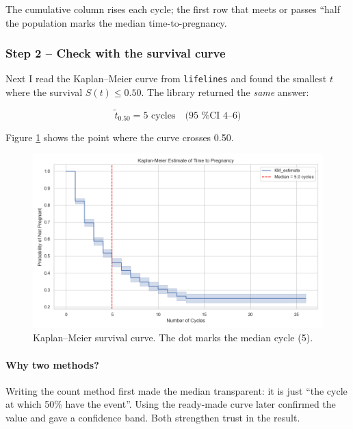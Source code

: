 \documentclass[11pt,a4paper]{article}
\begin{document}
The cumulative column rises each cycle; the first row that meets or passes
“half the population marks the median time-to-pregnancy.

\subsubsection{Step 2 – Check with the survival curve}
Next I read the Kaplan–Meier curve from \texttt{lifelines} and found the smallest
$t$ where the survival \(S(t)\le0.50\).
The library returned the \emph{same} answer:

\[
\tilde{t}_{0.50}=5 \text{ cycles} \quad\text{(95 \% CI 4–6)}
\]

Figure \ref{fig:km_median} shows the point where the curve crosses 0.50.

\begin{figure}[htbp]
  \centering
  \includegraphics[width=0.8\linewidth]{../results/Kaplan_meier_all.png}
  \caption{Kaplan–Meier survival curve.  The dot marks the median cycle (5).}
  \label{fig:km_median}
\end{figure}
\FloatBarrier

\paragraph{Why two methods?}
Writing the count method first made the median transparent:
it is just “the cycle at which 50\% have the event”.
Using the ready-made curve later confirmed the value and gave a confidence band.
Both strengthen trust in the result.



\end{document}
